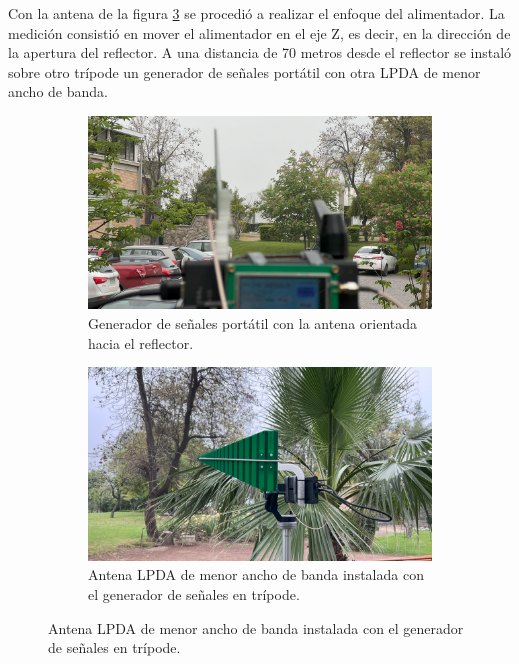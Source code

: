 Con la antena de la figura \ref{fig:antena_lpda} se procedió a realizar el enfoque del alimentador. La medición consistió en mover el alimentador en el eje Z, es decir, en la dirección de la apertura del reflector. A una distancia de 70 metros desde el reflector se instaló sobre otro trípode un generador de señales portátil con otra LPDA de menor ancho de banda.\\

\begin{figure}[h!]
    \centering
    \begin{subfigure}{0.45\textwidth}
        \includegraphics[width=\textwidth]{img/enfoque_cerca}
        \caption{Generador de señales portátil con la antena orientada hacia el reflector.}
        \label{fig:generador}
    \end{subfigure}
    \begin{subfigure}{0.45\textwidth}
        \includegraphics[width=\textwidth]{img/enfoque_cerca1}
        \caption{Antena LPDA de menor ancho de banda instalada con el generador de señales en trípode.}
        \label{fig:antena_lpda}
    \end{subfigure}
\end{figure}

